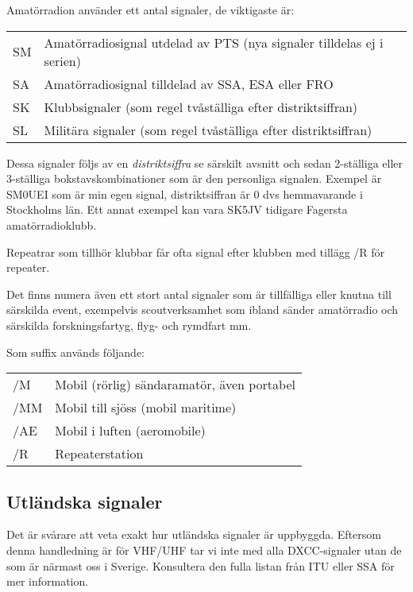 Amatörradion använder ett antal signaler, de viktigaste är:

\begin{tabular}{ll}
	SM & Amatörradiosignal utdelad av PTS (nya signaler tilldelas ej i serien) \\
	SA & Amatörradiosignal tilldelad av SSA, ESA eller FRO                     \\
	SK & Klubbsignaler (som regel tvåställiga efter distriktsiffran)           \\
	SL & Militära signaler (som regel tvåställiga efter distriktsiffran)
\end{tabular}

Dessa signaler följs av en \textit{distriktsiffra} se särskilt avsnitt och sedan 2-ställiga eller 3-ställiga bokstavskombinationer som är den personliga signalen. Exempel är SM0UEI som är min egen signal, distriktsiffran är 0 dvs hemmavarande i Stockholms län. Ett annat exempel kan vara SK5JV tidigare Fagersta amatörradioklubb.

Repeatrar som tillhör klubbar får ofta signal efter klubben med tillägg /R för repeater.

Det finns numera även ett stort antal signaler som är tillfälliga eller knutna till särskilda event, exempelvis scoutverksamhet som ibland sänder amatörradio och särskilda forskningsfartyg, flyg- och rymdfart mm.

Som suffix används följande:

\begin{tabular}{ll}
	/M  & Mobil (rörlig) sändaramatör, även portabel \\
	/MM & Mobil till sjöss (mobil maritime)          \\
	/AE & Mobil i luften (aeromobile)                \\
	/R  & Repeaterstation
\end{tabular}

\subsection{Utländska signaler}

Det är svårare att veta exakt hur utländska signaler är uppbyggda. Eftersom denna handledning är för VHF/UHF tar vi inte med alla DXCC-signaler utan de som är närmast oss i Sverige. Konsultera den fulla listan från ITU eller SSA för mer information.

